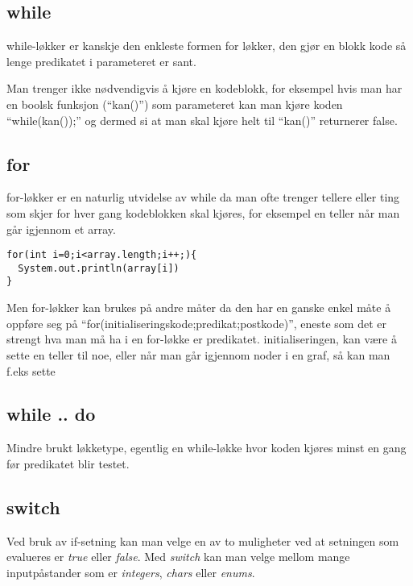 \documentclass[11pt]{article}
\begin{document}
\subsection{while}
\label{sec-5-1}

   
   while-løkker er kanskje den enkleste formen for løkker, den gjør en blokk kode
   så lenge predikatet i parameteret er sant. 

   Man trenger ikke nødvendigvis å kjøre
   en kodeblokk, for eksempel hvis man har en boolsk funksjon (``kan()'') som parameteret
   kan man kjøre koden ``while(kan());'' og dermed si at man skal kjøre helt til ``kan()''
   returnerer false.
\subsection{for}
\label{sec-5-2}

   
   for-løkker er en naturlig utvidelse av while da man ofte trenger tellere eller ting
   som skjer for hver gang kodeblokken skal kjøres, for eksempel en teller når man går
   igjennom et array.


\begin{verbatim}
for(int i=0;i<array.length;i++;){
  System.out.println(array[i])
}
\end{verbatim}

   Men for-løkker kan brukes på andre måter da den har en ganske enkel måte å oppføre 
   seg på ``for(initialiseringskode;predikat;postkode)'', eneste som det er strengt hva 
   man må ha i en for-løkke er predikatet. initialiseringen, kan være å sette en teller
   til noe, eller når man går igjennom noder i en graf, så kan man f.eks sette 
   
\subsection{while .. do}
\label{sec-5-3}

   
   Mindre brukt løkketype, egentlig en while-løkke hvor koden kjøres minst en gang før
   predikatet blir testet.
  
\subsection{switch}
\label{sec-5-4}


Ved bruk av if-setning kan man velge en av to muligheter ved at
setningen som evalueres er \emph{true} eller \emph{false}. Med \emph{switch} kan man
velge mellom mange inputpåstander som er \emph{integers}, \emph{chars} eller \emph{enums}. 
\end{document}
